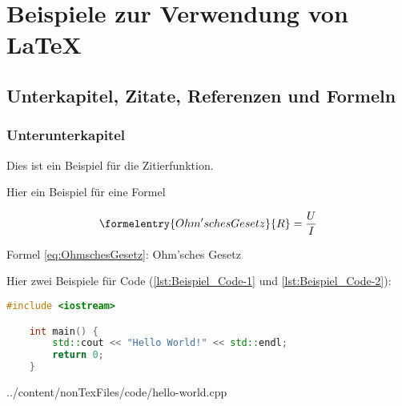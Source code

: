 


\chapter{Beispiele zur Verwendung von LaTeX}
   
\section{Unterkapitel, Zitate, Referenzen und Formeln}
\label{sec:Unterkapitel}

\subsection{Unterunterkapitel}

Dies ist ein Beispiel für die Zitierfunktion. \cite[Vgl.][S. 1 ff.]{Mustermann2023} 


\vspace{0.5cm}
Hier ein Beispiel für eine Formel

\begin{equation}
    \formelentry{Ohm'sches Gesetz}      %
    {R} = \frac{U}{I}
    \label{eq:OhmschesGesetz}
\end{equation}
\begin{center}
    Formel \ref{eq:OhmschesGesetz}: Ohm'sches Gesetz
\end{center}



\vspace{0.5cm}
Hier zwei Beispiele für Code (\ref{lst:Beispiel_Code-1} und \ref{lst:Beispiel_Code-2}):

\begin{lstlisting}[language=C++, caption={Beispiel: direktes einfügen von Code}, label={lst:Beispiel_Code-1}]
    #include <iostream>

    int main() {
        std::cout << "Hello World!" << std::endl;
        return 0;
    }
\end{lstlisting}


{../content/nonTexFiles/code/hello-world.cpp}

